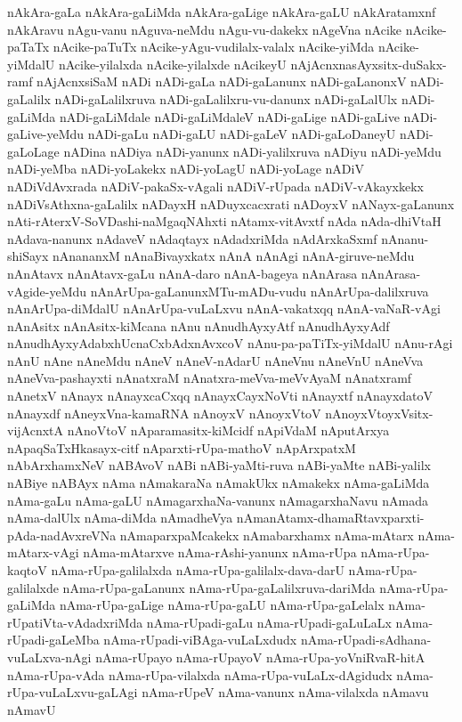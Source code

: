 {nAkAra-gaLa
nAkAra-gaLiMda
nAkAra-gaLige
nAkAra-gaLU
nAkAratamxnf
nAkAravu
nAgu-vanu
nAguva-neMdu
nAgu-vu-dakekx
nAgeVna
nAcike
nAcike-paTaTx
nAcike-paTuTx
nAcike-yAgu-vudilalx-valalx
nAcike-yiMda
nAcike-yiMdalU
nAcike-yilalxda
nAcike-yilalxde
nAcikeyU
nAjAcnxnasAyxsitx-duSakx-ramf
nAjAcnxsiSaM
nADi
nADi-gaLa
nADi-gaLanunx
nADi-gaLanonxV
nADi-gaLalilx
nADi-gaLalilxruva
nADi-gaLalilxru-vu-danunx
nADi-gaLalUlx
nADi-gaLiMda
nADi-gaLiMdale
nADi-gaLiMdaleV
nADi-gaLige
nADi-gaLive
nADi-gaLive-yeMdu
nADi-gaLu
nADi-gaLU
nADi-gaLeV
nADi-gaLoDaneyU
nADi-gaLoLage
nADina
nADiya
nADi-yanunx
nADi-yalilxruva
nADiyu
nADi-yeMdu
nADi-yeMba
nADi-yoLakekx
nADi-yoLagU
nADi-yoLage
nADiV
nADiVdAvxrada
nADiV-pakaSx-vAgali
nADiV-rUpada
nADiV-vAkayxkekx
nADiVsAthxna-gaLalilx
nADayxH
nADuyxcacxrati
nADoyxV
nANayx-gaLanunx
nAti-rAterxV-SoVDashi-naMgaqNAhxti
nAtamx-vitAvxtf
nAda
nAda-dhiVtaH
nAdava-nanunx
nAdaveV
nAdaqtayx
nAdadxriMda
nAdArxkaSxmf
nAnanu-shiSayx
nAnananxM
nAnaBivayxkatx
nAnA
nAnAgi
nAnA-giruve-neMdu
nAnAtavx
nAnAtavx-gaLu
nAnA-daro
nAnA-bageya
nAnArasa
nAnArasa-vAgide-yeMdu
nAnArUpa-gaLanunxMTu-mADu-vudu
nAnArUpa-dalilxruva
nAnArUpa-diMdalU
nAnArUpa-vuLaLxvu
nAnA-vakatxqq
nAnA-vaNaR-vAgi
nAnAsitx
nAnAsitx-kiMcana
nAnu
nAnudhAyxyAtf
nAnudhAyxyAdf
nAnudhAyxyAdabxhUcnaCxbAdxnAvxcoV
nAnu-pa-paTiTx-yiMdalU
nAnu-rAgi
nAnU
nAne
nAneMdu
nAneV
nAneV-nAdarU
nAneVnu
nAneVnU
nAneVva
nAneVva-pashayxti
nAnatxraM
nAnatxra-meVva-meVvAyaM
nAnatxramf
nAnetxV
nAnayx
nAnayxcaCxqq
nAnayxCayxNoVti
nAnayxtf
nAnayxdatoV
nAnayxdf
nAneyxVna-kamaRNA
nAnoyxV
nAnoyxVtoV
nAnoyxVtoyxVsitx-vijAcnxtA
nAnoVtoV
nAparamasitx-kiMcidf
nApiVdaM
nAputArxya
nApaqSaTxHkasayx-citf
nAparxti-rUpa-mathoV
nApArxpatxM
nAbArxhamxNeV
nABAvoV
nABi
nABi-yaMti-ruva
nABi-yaMte
nABi-yalilx
nABiye
nABAyx
nAma
nAmakaraNa
nAmakUkx
nAmakekx
nAma-gaLiMda
nAma-gaLu
nAma-gaLU
nAmagarxhaNa-vanunx
nAmagarxhaNavu
nAmada
nAma-dalUlx
nAma-diMda
nAmadheVya
nAmanAtamx-dhamaRtavxparxti-pAda-nadAvxreVNa
nAmaparxpaMcakekx
nAmabarxhamx
nAma-mAtarx
nAma-mAtarx-vAgi
nAma-mAtarxve
nAma-rAshi-yanunx
nAma-rUpa
nAma-rUpa-kaqtoV
nAma-rUpa-galilalxda
nAma-rUpa-galilalx-dava-darU
nAma-rUpa-galilalxde
nAma-rUpa-gaLanunx
nAma-rUpa-gaLalilxruva-dariMda
nAma-rUpa-gaLiMda
nAma-rUpa-gaLige
nAma-rUpa-gaLU
nAma-rUpa-gaLelalx
nAma-rUpatiVta-vAdadxriMda
nAma-rUpadi-gaLu
nAma-rUpadi-gaLuLaLx
nAma-rUpadi-gaLeMba
nAma-rUpadi-viBAga-vuLaLxdudx
nAma-rUpadi-sAdhana-vuLaLxva-nAgi
nAma-rUpayo
nAma-rUpayoV
nAma-rUpa-yoVniRvaR-hitA
nAma-rUpa-vAda
nAma-rUpa-vilalxda
nAma-rUpa-vuLaLx-dAgidudx
nAma-rUpa-vuLaLxvu-gaLAgi
nAma-rUpeV
nAma-vanunx
nAma-vilalxda
nAmavu
nAmavU
}
